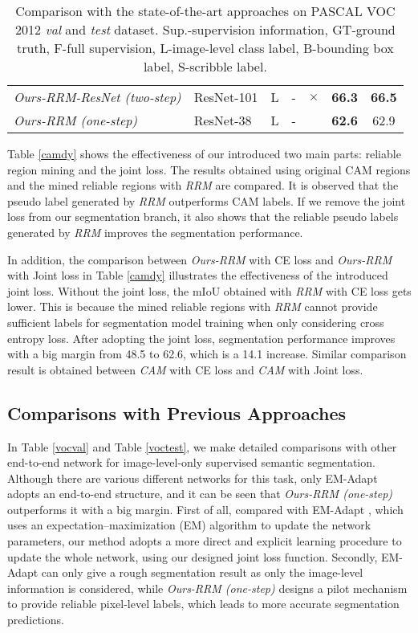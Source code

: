 \documentclass[letterpaper]{article} \usepackage{aaai20}  \usepackage{times}  \usepackage{helvet} \usepackage{courier}  \usepackage[hyphens]{url}  \usepackage{graphicx} \urlstyle{rm} \def\UrlFont{\rm}  \usepackage{graphicx}  \frenchspacing  \setlength{\pdfpagewidth}{8.5in}  \setlength{\pdfpageheight}{11in}
\begin{document}
\begin{table*}[!htbp]
\begin{center}
{\begin{tabular}{lllcccc}
 			\emph{Ours-RRM-ResNet (two-step)}  & ResNet-101 &L& - & $\times$ & \textbf{66.3}   & \textbf{66.5}\\ 
 			\emph{Ours-RRM (one-step)}  & ResNet-38 &L& - & \checkmark & \textbf{62.6} & 62.9  \\ 
 			\hline
 		\end{tabular}
 	}
 		\caption{
 			Comparison with the state-of-the-art approaches on PASCAL VOC 2012 \emph{val} and \emph{test} dataset. 
 			Sup.-supervision information, GT-ground truth, F-full supervision,  L-image-level class label, B-bounding box label, S-scribble label.
 		}\label{tab-state-of-art}
 	\end{center}
 \end{table*}
 

 Table \ref{camdy} shows the effectiveness of our introduced two main parts: reliable region mining and the joint loss. The results obtained using original CAM regions and the mined reliable regions with \emph{RRM} are compared. It is observed that the pseudo label generated by \emph{RRM} outperforms CAM labels. If we remove the joint loss from our segmentation branch, it also shows that the reliable pseudo labels generated by \emph{RRM} improves the segmentation performance. 

In addition, the comparison between \emph{Ours-RRM} with CE loss and \emph{Ours-RRM} with Joint loss in Table \ref{camdy} illustrates the effectiveness of the introduced joint loss. Without the joint loss, the mIoU obtained with \emph{RRM} with CE loss gets lower. This is because the mined reliable regions with \emph{RRM} cannot provide sufficient labels for segmentation model training when only considering cross entropy loss. After adopting the joint loss, segmentation performance improves with a big margin from 48.5 to 62.6, which is a 14.1 increase. Similar comparison result is obtained between \emph{CAM} with CE loss and \emph{CAM} with Joint loss. 
 


\subsection{Comparisons with Previous Approaches}

In Table \ref{vocval} and Table \ref{voctest}, we make detailed comparisons with other end-to-end network for image-level-only supervised semantic segmentation. Although there are various different networks for this task, only EM-Adapt \cite{papandreou1502weakly} adopts an end-to-end structure, and it can be seen that \emph{Ours-RRM (one-step)} outperforms it with a big margin. First of all, compared with EM-Adapt \cite{papandreou1502weakly}, which uses an expectation–maximization (EM) algorithm to update the network parameters, our method adopts a more direct and explicit learning procedure to update the whole network, using our designed joint loss function. Secondly, EM-Adapt \cite{papandreou1502weakly} can only give a rough segmentation result as only the image-level information is considered, while \emph{Ours-RRM (one-step)} designs a pilot mechanism to provide reliable pixel-level labels, which leads to more accurate segmentation predictions.
\end{document}
